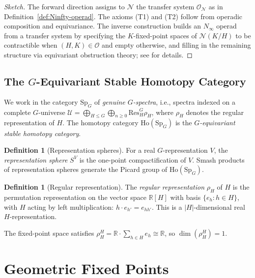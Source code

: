 \documentclass[12pt]{article}
\theoremstyle{definition}
\newtheorem{definition}[theorem]{Definition}
\newcommand{\cO}{\mathcal{O}}
\newcommand{\Sp}{\mathrm{Sp}}
\newcommand{\Ho}{\mathrm{Ho}}
\newcommand{\Res}{\mathrm{Res}}
\begin{document}
\begin{proof}[Sketch]
The forward direction assigns to $\mathcal{N}$ the transfer system $\cO_{\mathcal{N}}$ as in
Definition~\ref{def:Ninfty-operad}. The axioms (T1) and (T2) follow from operadic composition and
equivariance. The inverse construction builds an $N_\infty$ operad from a transfer system by
specifying the $K$-fixed-point spaces of $\mathcal{N}(K/H)$ to be contractible when $(H,K) \in \cO$
and empty otherwise, and filling in the remaining structure via equivariant obstruction theory; see
\cite{BlumbergHill} for details.
\end{proof}

\subsection{The $G$-Equivariant Stable Homotopy Category}

We work in the category $\Sp_G$ of \emph{genuine $G$-spectra}, i.e., spectra indexed on a complete
$G$-universe $\mathcal{U} = \bigoplus_{H \leq G} \bigoplus_{n \geq 0} \Res^G_H \rho_H$, where
$\rho_H$ denotes the regular representation of $H$. The homotopy category $\Ho(\Sp_G)$ is the
\emph{$G$-equivariant stable homotopy category}.

\begin{definition}[Representation spheres]
For a real $G$-representation $V$, the \emph{representation sphere} $S^V$ is the one-point
compactification of $V$. Smash products of representation spheres generate the Picard group of
$\Ho(\Sp_G)$.
\end{definition}

\begin{definition}[Regular representation]
\label{def:regular-rep}
The \emph{regular representation} $\rho_H$ of $H$ is the permutation representation on the vector
space $\mathbb{R}[H]$ with basis $\{e_h : h \in H\}$, with $H$ acting by left multiplication:
$h \cdot e_{h'} = e_{hh'}$. This is a $|H|$-dimensional real $H$-representation.

The fixed-point space satisfies $\rho_H^H = \mathbb{R} \cdot \sum_{h \in H} e_h \cong \mathbb{R}$,
so $\dim(\rho_H^H) = 1$.
\end{definition}

\section{Geometric Fixed Points}
\end{document}
